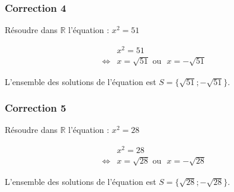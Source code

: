 \documentclass[15pt, mathserif]{beamer}
\newcommand{\R}{\mathbb{R}}			%
\begin{document}
\begin{frame}
\vspace{-10mm}
	\frametitle{Correction 4}
Résoudre dans $\R$ l'équation : $x^2=51$
 
 \begin{align*} 
 & x^2=51 \\ \Leftrightarrow & x=\sqrt{51} \text{~ou ~} x=-\sqrt{51} 
 \end{align*} 
 
 L'ensemble des solutions de l'équation est $S=\{\sqrt{51} ;-\sqrt{51} \}$. \end{frame}


\begin{frame}
\vspace{-10mm}
	\frametitle{Correction 5}
Résoudre dans $\R$ l'équation : $x^2=28$
 
 \begin{align*} 
 & x^2=28 \\ \Leftrightarrow & x=\sqrt{28} \text{~ou ~} x=-\sqrt{28} 
 \end{align*} 
 
 L'ensemble des solutions de l'équation est $S=\{\sqrt{28} ;-\sqrt{28} \}$. \end{frame}
\end{document}
